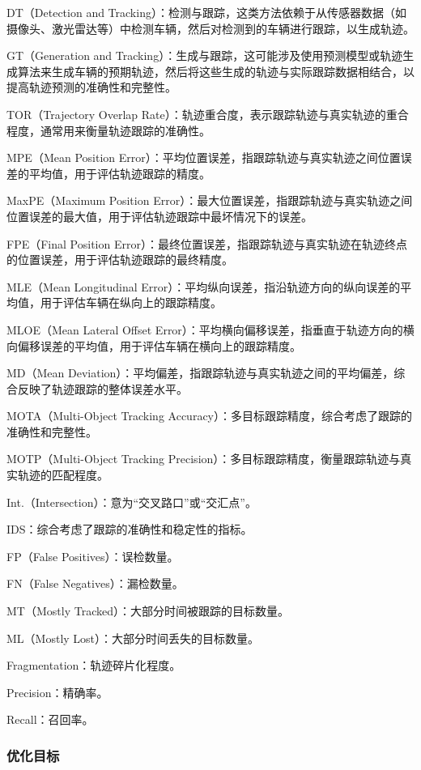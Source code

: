 DT（Detection and Tracking）：检测与跟踪，这类方法依赖于从传感器数据（如摄像头、激光雷达等）中检测车辆，然后对检测到的车辆进行跟踪，以生成轨迹。

GT（Generation and Tracking）：生成与跟踪，这可能涉及使用预测模型或轨迹生成算法来生成车辆的预期轨迹，然后将这些生成的轨迹与实际跟踪数据相结合，以提高轨迹预测的准确性和完整性。

TOR（Trajectory Overlap Rate）：轨迹重合度，表示跟踪轨迹与真实轨迹的重合程度，通常用来衡量轨迹跟踪的准确性。

MPE（Mean Position Error）：平均位置误差，指跟踪轨迹与真实轨迹之间位置误差的平均值，用于评估轨迹跟踪的精度。

MaxPE（Maximum Position Error）：最大位置误差，指跟踪轨迹与真实轨迹之间位置误差的最大值，用于评估轨迹跟踪中最坏情况下的误差。

FPE（Final Position Error）：最终位置误差，指跟踪轨迹与真实轨迹在轨迹终点的位置误差，用于评估轨迹跟踪的最终精度。

MLE（Mean Longitudinal Error）：平均纵向误差，指沿轨迹方向的纵向误差的平均值，用于评估车辆在纵向上的跟踪精度。

MLOE（Mean Lateral Offset Error）：平均横向偏移误差，指垂直于轨迹方向的横向偏移误差的平均值，用于评估车辆在横向上的跟踪精度。

MD（Mean Deviation）：平均偏差，指跟踪轨迹与真实轨迹之间的平均偏差，综合反映了轨迹跟踪的整体误差水平。

MOTA（Multi-Object Tracking Accuracy）：多目标跟踪精度，综合考虑了跟踪的准确性和完整性。

MOTP（Multi-Object Tracking Precision）：多目标跟踪精度，衡量跟踪轨迹与真实轨迹的匹配程度。

Int.（Intersection）：意为“交叉路口”或“交汇点”。

IDS：综合考虑了跟踪的准确性和稳定性的指标。

FP（False Positives）：误检数量。

FN（False Negatives）：漏检数量。

MT（Mostly Tracked）：大部分时间被跟踪的目标数量。

ML（Mostly Lost）：大部分时间丢失的目标数量。

Fragmentation：轨迹碎片化程度。

Precision：精确率。

Recall：召回率。
\subsubsection{优化目标}


